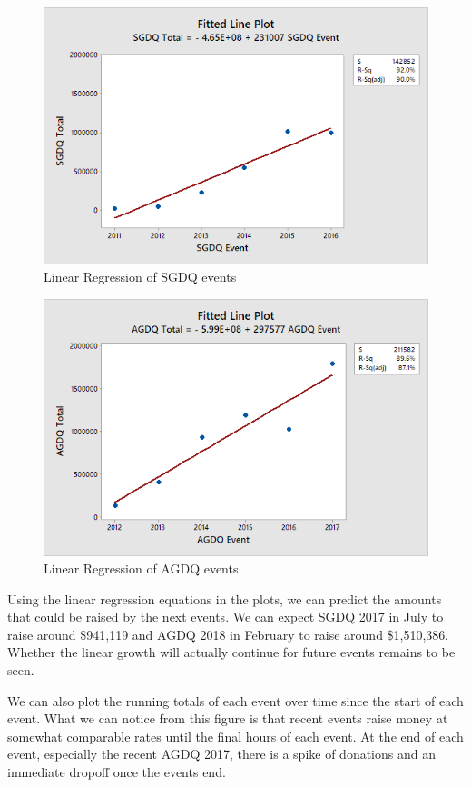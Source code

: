 \documentclass[journal]{IEEEtran}
\begin{document}
\begin{figure}
	\centering
	\includegraphics[scale=0.55]{SGDQLinearRegression}
	\caption{Linear Regression of SGDQ events}
\end{figure}

\begin{figure}
	\centering
	\includegraphics[scale=0.55]{AGDQLinearRegression}
	\caption{Linear Regression of AGDQ events}
\end{figure}

Using the linear regression equations in the plots, we can predict the amounts that could be raised by the next events. We can expect SGDQ 2017 in July to raise around \$941,119 and AGDQ 2018 in February to raise around \$1,510,386. Whether the linear growth will actually continue for future events remains to be seen.

We can also plot the running totals of each event over time since the start of each event. What we can notice from this figure is that recent events raise money at somewhat comparable rates until the final hours of each event. At the end of each event, especially the recent AGDQ 2017, there is a spike of donations and an immediate dropoff once the events end.
\end{document}

